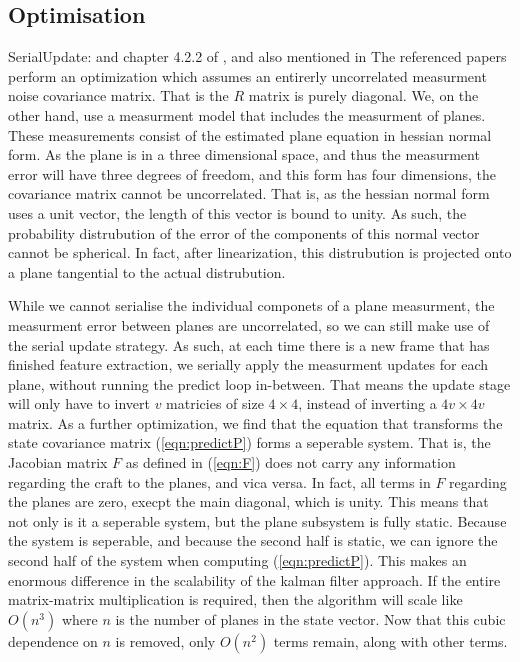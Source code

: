 \documentclass[]{article}
\begin{document}
{\subsection{Optimisation} %
\label{sub:optimisation}

SerialUpdate: \cite{OpenPilotPaper} and chapter 4.2.2 of \cite{KFBookSerialupdate}, and also mentioned in \cite{Sola2013}
The referenced papers perform an optimization which assumes an entirerly uncorrelated measurment noise covariance matrix. That is the $R$ matrix is purely diagonal.
We, on the other hand, use a measurment model that includes the measurment of planes. These measurements consist of the estimated plane equation in hessian normal form. As the plane is in a three dimensional space, and thus the measurment error will have three degrees of freedom, and this form has four dimensions, the covariance matrix cannot be uncorrelated.
That is, as the hessian normal form uses a unit vector, the length of this vector is bound to unity. As such, the probability distrubution of the error of the components of this normal vector cannot be spherical.
In fact, after linearization, this distrubution is projected onto a plane tangential to the actual distrubution. 

While we cannot serialise the individual componets of a plane measurment, the measurment error between planes are uncorrelated, so we can still make use of the serial update strategy. As such, at each time there is a new frame that has finished feature extraction, we serially apply the measurment updates for each plane, without running the predict loop in-between.
That means the update stage will only have to invert $v$ matricies of size $4\times4$, instead of inverting a $4v \times 4v$ matrix. 
As a further optimization, we find that the equation that transforms the state covariance matrix (\ref{eqn:predictP}) forms a seperable system. That is, the Jacobian matrix $F$ as defined in (\ref{eqn:F}) does not carry any information regarding the craft to the planes, and vica versa.
In fact, all terms in $F$ regarding the planes are zero, execpt the main diagonal, which is unity. This means that not only is it a seperable system, but the plane subsystem is fully static.
Because the system is seperable, and because the second half is static, we can ignore the second half of the system when computing (\ref{eqn:predictP}).
This makes an enormous difference in the scalability of the kalman filter approach. If the entire matrix-matrix multiplication is required, then the algorithm will scale like $O(n^3)$ where $n$ is the number of planes in the state vector. Now that this cubic dependence on $n$ is removed, only $O(n^2)$ terms remain, along with other terms.

}
\end{document}
